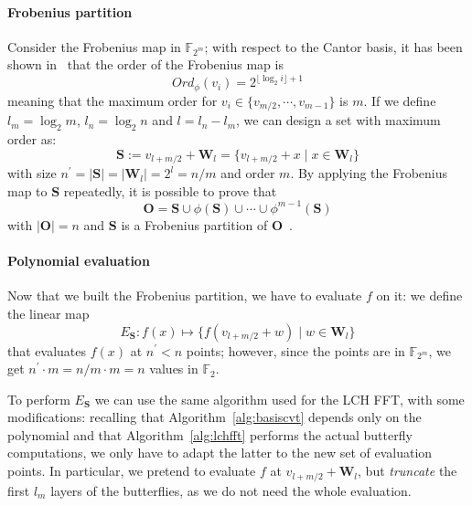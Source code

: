     \paragraph{Frobenius partition}
        Consider the Frobenius map in $\mathds{F}_{2^m}$; with respect to the Cantor basis, it has been shown in~\cite{DBLP:conf/issac/LiCKCY18}
        that the order of the Frobenius map is
        \begin{equation}
            Ord_{\phi}(v_i) = 2^{\lfloor \log_2 i \rfloor+1} 
        \end{equation}
        meaning that the maximum order for $v_i \in \{v_{m/2}, \cdots, v_{m-1}\}$ is $m$. 
        If we define $l_m = \log_2 m$, $l_n = \log_2 n$ and $l = l_n-l_m$, we can design a set with maximum order as:
        \begin{equation}
            \mathbf{S} := v_{l+m/2}+\mathbf{W}_l = \{v_{l+m/2} + x \mid x \in \mathbf{W}_l\}
            \label{eq:frobenius_partition}
        \end{equation}
        with size $n^\prime = |\mathbf{S}| = |\mathbf{W}_l| = 2^l = n/m$ and order $m$. By applying the Frobenius map to $\mathbf{S}$ repeatedly, it is possible to prove that
        \begin{equation}
            \mathbf{O} = \mathbf{S} \cup \phi(\mathbf{S}) \cup \cdots \cup \phi^{m-1}(\mathbf{S})
        \end{equation}
        with $|\mathbf{O}| = n$ and $\mathbf{S}$ is a Frobenius partition of $\mathbf{O}$~\cite{DBLP:conf/issac/LiCKCY18}.

    \paragraph{Polynomial evaluation}
        Now that we built the Frobenius partition, we have to evaluate $f$ on it: we define the linear map
        \begin{equation}
            E_\mathbf{S} : f(x) \mapsto \{f(v_{l+m/2} + w) \mid w \in \mathbf{W}_l\}
        \end{equation}
        that evaluates $f(x)$ at $n^\prime < n$ points; however, since the points are in $\mathds{F}_{2^m}$, we
        get $n^\prime \cdot m = n/m\cdot m = n$ values in $\mathds{F}_2$. 

        To perform $E_\mathbf{S}$ we can use the same algorithm used for the LCH FFT, with some modifications:
        recalling that Algorithm~\ref{alg:basiscvt} depends only on the polynomial and that Algorithm~\ref{alg:lchfft} 
        performs the actual butterfly computations, we only have to adapt the latter to the new set of evaluation points.
        In particular, we pretend to evaluate $f$ at $v_{l+m/2} + \mathbf{W}_l$, but \emph{truncate} the first $l_m$ layers of
        the butterflies, as we do not need the whole evaluation.
        
